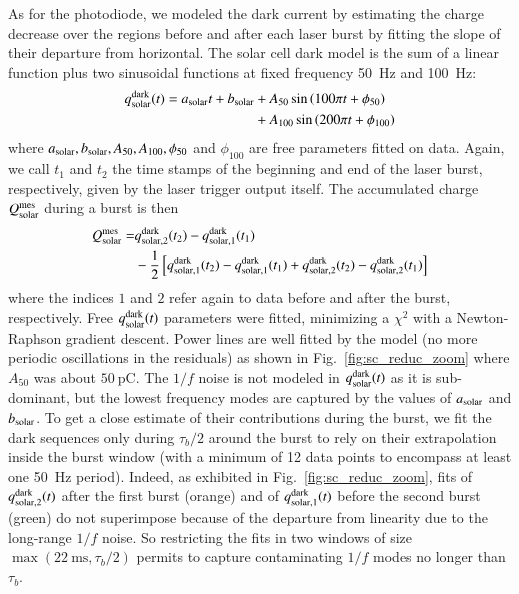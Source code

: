 As for the photodiode, we modeled the dark current by estimating the charge decrease over the regions before and after each laser burst by fitting the slope of their departure from horizontal. The solar cell dark model is the sum of a linear function plus two sinusoidal functions at fixed frequency \SI{50}{\hertz} and \SI{100}{\hertz}:
\begin{align}
    q_{\rm solar}^{\rm dark}(t) = a_{\rm solar}t + b_{\rm solar} & + A_{50} \sin \left( 100 \pi t + \phi_{50}\right)  \notag \\  & +  A_{100} \sin \left( 200 \pi t + \phi_{100}\right)
\end{align}
where $a_{\rm solar}, b_{\rm solar}, A_{50}, A_{100}, \phi_{50}$ and $\phi_{100}$ are free parameters fitted on data. 
Again, we call $t_1$ and $t_2$ the time stamps of the beginning and end of the laser burst, respectively, given by the laser trigger output itself.
The accumulated charge $Q_{\mathrm{solar}}^{\mathrm{mes}}$ during a burst is then
\begin{align}\label{eq:qsolar}
Q_{\mathrm{solar}}^{\mathrm{mes}}  = & q_{\rm solar,2}^{\rm dark}(t_2) - q_{\rm solar, 1}^{\rm dark}(t_1) \\  &  - \frac{1}{2} \left[q_{\rm solar,1}^{\rm dark}(t_2) - q_{\rm solar,1}^{\rm dark}(t_1) + q_{\rm solar,2}^{\rm dark}(t_2) - q_{\rm solar,2}^{\rm dark}(t_1)  \right]    \notag
\end{align}
where the indices $1$ and $2$ refer again to data before and after the burst, respectively.  Free $q_{\rm solar}^{\rm dark}(t)$ parameters were fitted, minimizing a $\chi^2$ with a Newton-Raphson gradient descent. Power lines are well fitted by the model (no more periodic oscillations in the residuals) as shown in Fig.~\ref{fig:sc_reduc_zoom} where $A_{50}$ was about $\SI{50}{\pico\coulomb}$.
The $1/f$ noise is not modeled in $q_{\rm solar}^{\rm dark}(t)$ as it is sub-dominant, but the lowest frequency modes are captured by the values of $a_{\rm solar}$ and $b_{\rm solar}$. To get a close estimate of their contributions during the burst, we fit the dark sequences only during $\tau_b/2$ around the burst to rely on their extrapolation inside the burst window (with a minimum of 12 data points to encompass at least one \SI{50}{\hertz} period). %
Indeed, as exhibited in Fig.~\ref{fig:sc_reduc_zoom}, fits of $q_{\rm solar,2}^{\rm dark}(t)$ after the first burst (orange) and of $q_{\rm solar,1}^{\rm dark}(t)$ before the second burst (green) do not superimpose because of the departure from linearity due to the long-range $1/f$ noise. So restricting the fits in two windows of size $\max(\SI{22}{\ms},\tau_b/2)$ permits to capture contaminating $1/f$ modes no longer than $\tau_b$. 

